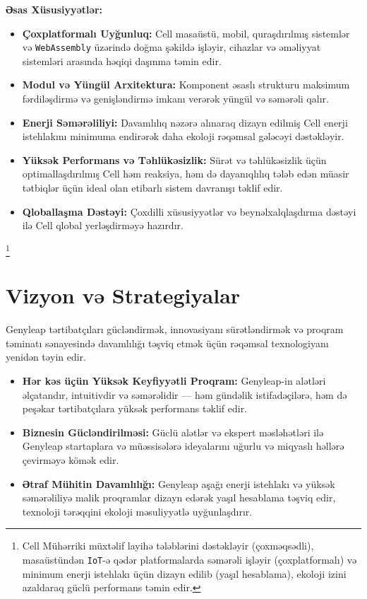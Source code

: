 \documentclass[a4paper,12pt,openany]{book}
\begin{document}
\textbf{Əsas Xüsusiyyətlər:}
\begin{itemize}
    \item \textbf{Çoxplatformalı Uyğunluq:} Cell masaüstü, mobil, quraşdırılmış sistemlər və \texttt{WebAssembly} üzərində doğma şəkildə işləyir, cihazlar və əməliyyat sistemləri arasında həqiqi daşınma təmin edir.
    \item \textbf{Modul və Yüngül Arxitektura:} Komponent əsaslı strukturu maksimum fərdiləşdirmə və genişləndirmə imkanı verərək yüngül və səmərəli qalır.
    \item \textbf{Enerji Səmərəliliyi:} Davamlılıq nəzərə alınaraq dizayn edilmiş Cell enerji istehlakını minimuma endirərək daha ekoloji rəqəmsal gələcəyi dəstəkləyir.
    \item \textbf{Yüksək Performans və Təhlükəsizlik:} Sürət və təhlükəsizlik üçün optimallaşdırılmış Cell həm reaksiya, həm də dayanıqlılıq tələb edən müasir tətbiqlər üçün ideal olan etibarlı sistem davranışı təklif edir.
    \item \textbf{Qloballaşma Dəstəyi:} Çoxdilli xüsusiyyətlər və beynəlxalqlaşdırma dəstəyi ilə Cell qlobal yerləşdirməyə hazırdır.
\end{itemize}

\footnote{Cell Mühərriki müxtəlif layihə tələblərini dəstəkləyir (çoxməqsədli), masaüstündən \texttt{IoT}-ə qədər platformalarda səmərəli işləyir (çoxplatformalı) və minimum enerji istehlakı üçün dizayn edilib (yaşıl hesablama), ekoloji izini azaldaraq güclü performans təmin edir.}

\chapter{Vizyon və Strategiyalar}

Genyleap tərtibatçıları gücləndirmək, innovasiyanı sürətləndirmək və proqram təminatı sənayesində davamlılığı təşviq etmək üçün rəqəmsal texnologiyanı yenidən təyin edir.

\begin{itemize}
    \item \textbf{Hər kəs üçün Yüksək Keyfiyyətli Proqram:} Genyleap-in alətləri əlçatandır, intuitivdir və səmərəlidir — həm gündəlik istifadəçilərə, həm də peşəkar tərtibatçılara yüksək performans təklif edir.
    \item \textbf{Biznesin Gücləndirilməsi:} Güclü alətlər və ekspert məsləhətləri ilə Genyleap startaplara və müəssisələrə ideyalarını uğurlu və miqyaslı həllərə çevirməyə kömək edir.
    \item \textbf{Ətraf Mühitin Davamlılığı:} Genyleap aşağı enerji istehlakı və yüksək səmərəliliyə malik proqramlar dizayn edərək yaşıl hesablama təşviq edir, texnoloji tərəqqini ekoloji məsuliyyətlə uyğunlaşdırır.
\end{itemize}
\end{document}
